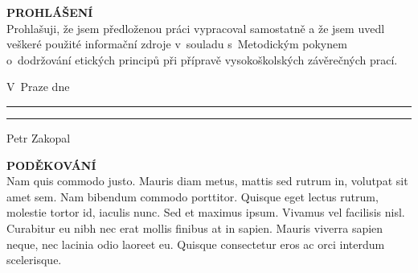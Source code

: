 \documentclass[a4paper, twoside, 11pt]{article}
\begin{document}
\newpage

\newpage




\null\newpage


\null\newpage

\setcounter{page}{5}%

\noindent \textcolor{ctublue}{{\Large{\textbf{\MakeTextUppercase{Prohlášení}}}}}\\
			Prohlašuji, že jsem předloženou práci vypracoval samostatně a že jsem uvedl veškeré použité informační zdroje v~souladu s~Metodickým pokynem o~dodržování etických principů při přípravě vysokoškolských závěrečných prací.\\
		\vspace{1.5cm}
		
	

	\noindent	V~Praze dne \rule{3.5cm}{0.4pt} \hspace{6.6cm}  \rule{4cm}{0.4pt}
	
	\hspace{12.65cm}Petr Zakopal


		\vspace{14cm}
		
	\noindent	\textcolor{ctublue}{{\Large{\textbf{\MakeTextUppercase{Poděkování}}}}}\\
	Nam quis commodo justo. Mauris diam metus, mattis sed rutrum in, volutpat sit amet sem. Nam bibendum commodo porttitor. Quisque eget lectus rutrum, molestie tortor id, iaculis nunc. Sed et maximus ipsum. Vivamus vel facilisis nisl. Curabitur eu nibh nec erat mollis finibus at in sapien. Mauris viverra sapien neque, nec lacinia odio laoreet eu. Quisque consectetur eros ac orci interdum scelerisque.
		


\end{document}
